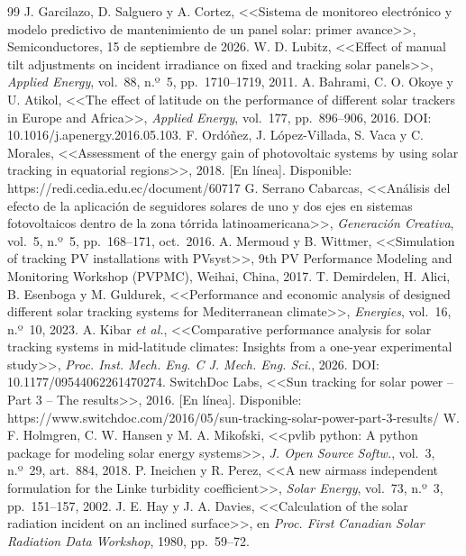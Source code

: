\documentclass[10pt,letterpaper,twocolumn]{article}
\begin{document}
\begin{thebibliography}{99}\small
{} J. Garcilazo, D. Salguero y A. Cortez, <<Sistema de monitoreo electrónico y modelo predictivo de mantenimiento de un panel solar: primer avance>>, Semiconductores, 15 de septiembre de 2026.
 W. D. Lubitz, <<Effect of manual tilt adjustments on incident irradiance on fixed and tracking solar panels>>, \emph{Applied Energy}, vol.~88, n.º~5, pp.~1710--1719, 2011.
 A. Bahrami, C. O. Okoye y U. Atikol, <<The effect of latitude on the performance of different solar trackers in Europe and Africa>>, \emph{Applied Energy}, vol.~177, pp.~896--906, 2016. DOI: 10.1016/j.apenergy.2016.05.103.
 F. Ordóñez, J. López-Villada, S. Vaca y C. Morales, <<Assessment of the energy gain of photovoltaic systems by using solar tracking in equatorial regions>>, 2018. [En línea]. Disponible: https://redi.cedia.edu.ec/document/60717
 G. Serrano Cabarcas, <<Análisis del efecto de la aplicación de seguidores solares de uno y dos ejes en sistemas fotovoltaicos dentro de la zona tórrida latinoamericana>>, \emph{Generación Creativa}, vol.~5, n.º~5, pp.~168--171, oct.~2016.
 A. Mermoud y B. Wittmer, <<Simulation of tracking PV installations with PVsyst>>, 9th PV Performance Modeling and Monitoring Workshop (PVPMC), Weihai, China, 2017.
 T. Demirdelen, H. Alici, B. Esenboga y M. Guldurek, <<Performance and economic analysis of designed different solar tracking systems for Mediterranean climate>>, \emph{Energies}, vol.~16, n.º~10, 2023.
 A. Kibar \emph{et al.}, <<Comparative performance analysis for solar tracking systems in mid-latitude climates: Insights from a one-year experimental study>>, \emph{Proc. Inst. Mech. Eng. C J. Mech. Eng. Sci.}, 2026. DOI: 10.1177/09544062261470274.
 SwitchDoc Labs, <<Sun tracking for solar power -- Part 3 -- The results>>, 2016. [En línea]. Disponible: https://www.switchdoc.com/2016/05/sun-tracking-solar-power-part-3-results/
 W. F. Holmgren, C. W. Hansen y M. A. Mikofski, <<pvlib python: A python package for modeling solar energy systems>>, \emph{J. Open Source Softw.}, vol.~3, n.º~29, art.~884, 2018.
 P. Ineichen y R. Perez, <<A new airmass independent formulation for the Linke turbidity coefficient>>, \emph{Solar Energy}, vol.~73, n.º~3, pp.~151--157, 2002.
 J. E. Hay y J. A. Davies, <<Calculation of the solar radiation incident on an inclined surface>>, en \emph{Proc. First Canadian Solar Radiation Data Workshop}, 1980, pp.~59--72.

\end{thebibliography}
\end{document}
